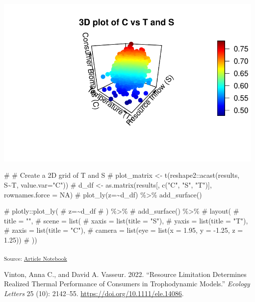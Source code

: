 \documentclass[
  letterpaper,
  DIV=11,
  numbers=noendperiod]{scrartcl}
\newenvironment{Shaded}{\begin{snugshade}}{\end{snugshade}}
\newcommand{\CommentTok}[1]{\textcolor[rgb]{0.37,0.37,0.37}{#1}}
\newlength{\cslhangindent}
\newenvironment{CSLReferences}[2] %
 {\begin{list}{}{%
  \setlength{\itemindent}{0pt}
  \setlength{\leftmargin}{0pt}
  \setlength{\parsep}{0pt}
  \ifodd #1
   \setlength{\leftmargin}{\cslhangindent}
   \setlength{\itemindent}{-1\cslhangindent}
  \fi
  \setlength{\itemsep}{#2\baselineskip}}}
 {\end{list}}
\begin{document}
\includegraphics{index_files/figure-pdf/unnamed-chunk-2-4.pdf}

\begin{Shaded}
\begin{Highlighting}[]
\CommentTok{\# \# Create a 2D grid of T and S}
\CommentTok{\# plot\_matrix \textless{}{-} t(reshape2::acast(results, S\textasciitilde{}T, value.var="C"))}
\CommentTok{\# d\_df \textless{}{-} as.matrix(results[, c("C", "S", "T")], rownames.force = NA)}
\CommentTok{\# plot\_ly(z=\textasciitilde{}d\_df) \%\textgreater{}\% add\_surface()}

\CommentTok{\# plotly::plot\_ly(}
\CommentTok{\#       z=\textasciitilde{}d\_df}
\CommentTok{\#     ) \%\textgreater{}\% }
\CommentTok{\#   add\_surface() \%\textgreater{}\%}
\CommentTok{\#   layout(}
\CommentTok{\#     title = "",}
\CommentTok{\#     scene = list(}
\CommentTok{\#       xaxis = list(title = "S"),}
\CommentTok{\#       yaxis = list(title = "T"),}
\CommentTok{\#       zaxis = list(title = "C"),}
\CommentTok{\#       camera = list(eye = list(x = 1.95, y = {-}1.25, z = 1.25))}
\CommentTok{\#     ))}
\end{Highlighting}
\end{Shaded}

\textsubscript{Source:
\href{https://colebrookson.github.io/theRmal-landscape/index.qmd.html}{Article
Notebook}}

\label{refs}
\begin{CSLReferences}{1}{0}
Vinton, Anna C., and David A. Vasseur. 2022. {``Resource Limitation
Determines Realized Thermal Performance of Consumers in Trophodynamic
Models.''} \emph{Ecology Letters} 25 (10): 2142--55.
\url{https://doi.org/10.1111/ele.14086}.

\end{CSLReferences}
\end{document}
